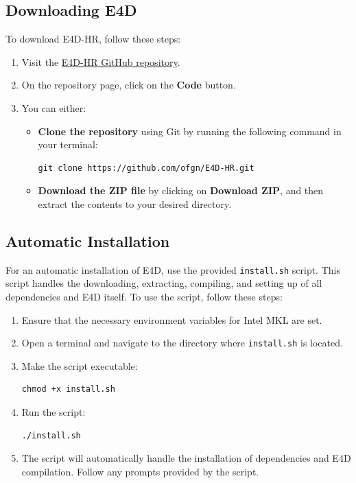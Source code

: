 \documentclass[a4paper,12pt]{article}
\begin{document}
\subsection{Downloading E4D}

To download E4D-HR, follow these steps:

\begin{enumerate}
    \item Visit the \href{https://github.com/ofgn/E4D-HR}{E4D-HR GitHub repository}.
    \item On the repository page, click on the \textbf{Code} button.
    \item You can either:
    \begin{itemize}
        \item \textbf{Clone the repository} using Git by running the following command in your terminal:
        \begin{verbatim}
git clone https://github.com/ofgn/E4D-HR.git
        \end{verbatim}
        \item \textbf{Download the ZIP file} by clicking on \textbf{Download ZIP}, and then extract the contents to your desired directory.
    \end{itemize}
\end{enumerate}

\subsection{Automatic Installation}

For an automatic installation of E4D, use the provided \texttt{install.sh} script. This script handles the downloading, extracting, compiling, and setting up of all dependencies and E4D itself. To use the script, follow these steps:

\begin{enumerate}
    \item Ensure that the necessary environment variables for Intel MKL are set.
    \item Open a terminal and navigate to the directory where \texttt{install.sh} is located.
    \item Make the script executable: \begin{verbatim}
chmod +x install.sh \end{verbatim}
    \item Run the script:  \begin{verbatim}
./install.sh   \end{verbatim}
    \item The script will automatically handle the installation of dependencies and E4D compilation. Follow any prompts provided by the script.
\end{enumerate}
\end{document}
